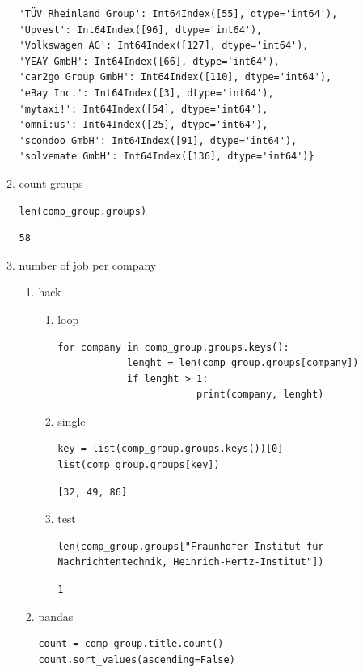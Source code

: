 \documentclass[11pt]{article}
\begin{document}
\begin{enumerate}
\begin{enumerate}
\begin{verbatim}
'TÜV Rheinland Group': Int64Index([55], dtype='int64'),
'Upvest': Int64Index([96], dtype='int64'),
'Volkswagen AG': Int64Index([127], dtype='int64'),
'YEAY GmbH': Int64Index([66], dtype='int64'),
'car2go Group GmbH': Int64Index([110], dtype='int64'),
'eBay Inc.': Int64Index([3], dtype='int64'),
'mytaxi!': Int64Index([54], dtype='int64'),
'omni:us': Int64Index([25], dtype='int64'),
'scondoo GmbH': Int64Index([91], dtype='int64'),
'solvemate GmbH': Int64Index([136], dtype='int64')}
\end{verbatim}
\item count groups
\label{sec:orgb3e32b4}
\begin{verbatim}
len(comp_group.groups)
\end{verbatim}

\begin{verbatim}
58
\end{verbatim}
\item number of job per company
\label{sec:orgc68fcfb}
\begin{enumerate}
\item hack
\label{sec:orgbb0da18}
\begin{enumerate}
\item loop
\label{sec:orge861cdf}
\begin{verbatim}
for company in comp_group.groups.keys():
            lenght = len(comp_group.groups[company])
            if lenght > 1:
                        print(company, lenght)
\end{verbatim}

\item single
\label{sec:orgfe20cb0}
\begin{verbatim}
key = list(comp_group.groups.keys())[0]
list(comp_group.groups[key])
\end{verbatim}

\begin{verbatim}
[32, 49, 86]
\end{verbatim}

\item test
\label{sec:org5f36d6c}
\begin{verbatim}
len(comp_group.groups["Fraunhofer-Institut für Nachrichtentechnik, Heinrich-Hertz-Institut"])
\end{verbatim}

\begin{verbatim}
1
\end{verbatim}
\end{enumerate}
\item pandas
\label{sec:orgf334d43}
\begin{verbatim}
count = comp_group.title.count()
count.sort_values(ascending=False)
\end{verbatim}


\end{enumerate}
\end{enumerate}
\end{enumerate}
\end{document}
